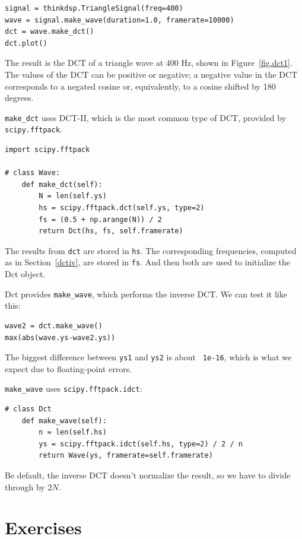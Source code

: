 \documentclass[12pt]{book}
\begin{document}
\begin{verbatim}
signal = thinkdsp.TriangleSignal(freq=400)
wave = signal.make_wave(duration=1.0, framerate=10000)
dct = wave.make_dct()
dct.plot()
\end{verbatim}

The result is the DCT of a triangle wave at 400 Hz, shown in
Figure~\ref{fig.dct1}.  The values of the DCT can be positive or negative;
a negative value in the DCT corresponds to a negated cosine or,
equivalently, to a cosine shifted by 180 degrees.

\verb"make_dct" uses DCT-II, which is the most common type of DCT,
provided by {\tt scipy.fftpack}.

\begin{verbatim}
import scipy.fftpack

# class Wave:
    def make_dct(self):
        N = len(self.ys)
        hs = scipy.fftpack.dct(self.ys, type=2)
        fs = (0.5 + np.arange(N)) / 2
        return Dct(hs, fs, self.framerate)
\end{verbatim}

The results from {\tt dct} are stored in {\tt hs}.  The corresponding
frequencies, computed as in Section~\ref{dctiv}, are stored in {\tt fs}.
And then both are used to initialize the Dct object.

Dct provides \verb"make_wave", which performs the inverse DCT.
We can test it like this:

\begin{verbatim}
wave2 = dct.make_wave()
max(abs(wave.ys-wave2.ys))
\end{verbatim}

The biggest difference between {\tt ys1} and {\tt ys2} is about {\tt
  1e-16}, which is what we expect due to floating-point errors.

\verb"make_wave" uses {\tt scipy.fftpack.idct}: 

\begin{verbatim}
# class Dct
    def make_wave(self):
        n = len(self.hs)
        ys = scipy.fftpack.idct(self.hs, type=2) / 2 / n
        return Wave(ys, framerate=self.framerate) 
\end{verbatim}

Be default, the inverse DCT doesn't normalize the result, so we have
to divide through by $2N$.


\section{Exercises}
\end{document}
